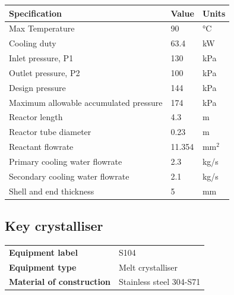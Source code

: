 \begin{table}[H]
\centering
\begin{tabular}{@{}l|l|l@{}}
\toprule
\textbf{Specification}                    & \textbf{Value} & \textbf{Units} \\ \midrule
Max Temperature                           & 90             & °C             \\ \midrule
Cooling duty                              & 63.4         & kW                \\ \midrule
Inlet   pressure, P1                      & 130        & kPa            \\ \midrule
Outlet   pressure, P2                     & 100            & kPa            \\ \midrule
Design   pressure                       & 144        & kPa            \\ \midrule
Maximum   allowable accumulated  pressure & 174        & kPa            \\ \midrule
Reactor length                            & 4.3          & m               \\ \midrule
Reactor tube diameter                            & 0.23          & m               \\ \midrule
Reactant flowrate                         & 11.354         & mm$^2$            \\ \midrule
Primary cooling water flowrate            & 2.3           & kg/s             \\ \midrule
Secondary cooling water flowrate          & 2.1         & kg/s            \\ \midrule
Shell and end thickness                   & 5         & mm            \\ \bottomrule
\end{tabular}
\end{table}
\newpage

\subsection{Key crystalliser}

\begin{table}[H]
    \centering
    \begin{tabular}{@{}l|l@{}}
    \toprule
      \textbf{Equipment label}  & S104\\
       \textbf{Equipment type}  & Melt crystalliser \\
       \textbf{Material of construction} & Stainless steel 304-S71 \\
       \bottomrule
    \end{tabular}
\end{table}


